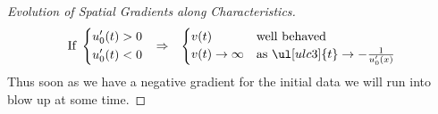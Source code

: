 \begin{proofbox}
\begin{proof}[\newline Evolution of Spatial Gradients along Characteristics]
\begin{align*}
            \text{If }
            \left\{\begin{aligned}
                &u'_0(t)>0\\
                &u'_0(t)<0
            \end{aligned}\right.&&\Rightarrow&&
            \begin{cases}
                v(t)&\text{well behaved}\\
                v(t)\to\infty&\text{as $\ul[ulc3]{t}\to-\frac{1}{u'_{0}(x)}$}
            \end{cases}
          \end{align*}
          Thus soon as we have a negative gradient for the initial data we will run into blow up at some time.
    \end{proof}
\end{proofbox}

